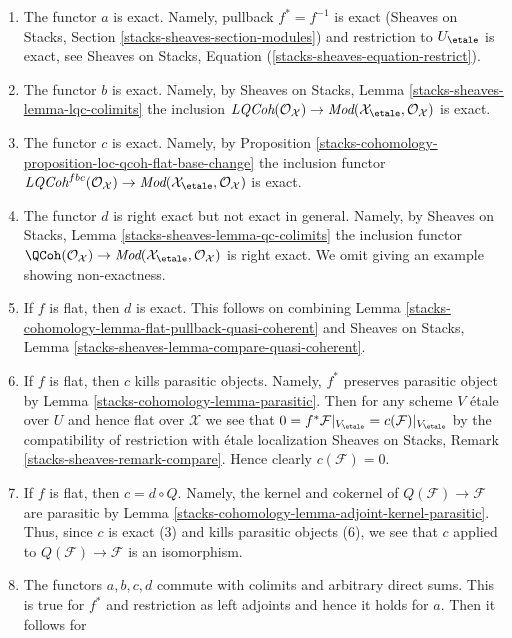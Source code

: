 \begin{enumerate}
\item The functor $a$ is exact. Namely, pullback $f^* = f^{-1}$ is exact
(Sheaves on Stacks, Section \ref{stacks-sheaves-section-modules})
and restriction to $U_\etale$ is exact, see
Sheaves on Stacks, Equation (\ref{stacks-sheaves-equation-restrict}).
\item The functor $b$ is exact. Namely, by
Sheaves on Stacks, Lemma \ref{stacks-sheaves-lemma-lqc-colimits}
the inclusion $\textit{LQCoh}(\mathcal{O}_\mathcal{X}) \to
\textit{Mod}(\mathcal{X}_\etale, \mathcal{O}_\mathcal{X})$ is exact.
\item The functor $c$ is exact. Namely, by
Proposition \ref{stacks-cohomology-proposition-loc-qcoh-flat-base-change}
the inclusion functor $\textit{LQCoh}^{fbc}(\mathcal{O}_\mathcal{X}) \to
\textit{Mod}(\mathcal{X}_\etale, \mathcal{O}_\mathcal{X})$ is exact.
\item The functor $d$ is right exact but not exact in general.
Namely, by Sheaves on Stacks, Lemma
\ref{stacks-sheaves-lemma-qc-colimits}
the inclusion functor $\QCoh(\mathcal{O}_\mathcal{X}) \to
\textit{Mod}(\mathcal{X}_\etale, \mathcal{O}_\mathcal{X})$ is right
exact. We omit giving an example showing non-exactness.
\item If $f$ is flat, then $d$ is exact. This follows on combining
Lemma \ref{stacks-cohomology-lemma-flat-pullback-quasi-coherent} and
Sheaves on Stacks, Lemma \ref{stacks-sheaves-lemma-compare-quasi-coherent}.
\item If $f$ is flat, then $c$ kills parasitic objects.
Namely, $f^*$ preserves parasitic object by Lemma \ref{stacks-cohomology-lemma-parasitic}.
Then for any scheme $V$ \'etale over $U$ and hence flat over $\mathcal{X}$
we see that
$0 = f^*\mathcal{F}|_{V_\etale} = c(\mathcal{F})|_{V_\etale}$
by the compatibility of restriction with \'etale localization
Sheaves on Stacks, Remark \ref{stacks-sheaves-remark-compare}.
Hence clearly $c(\mathcal{F}) = 0$.
\item If $f$ is flat, then $c = d \circ Q$. Namely, the kernel and
cokernel of $Q(\mathcal{F}) \to \mathcal{F}$ are parasitic by
Lemma \ref{stacks-cohomology-lemma-adjoint-kernel-parasitic}. Thus, since
$c$ is exact (3) and kills parasitic objects (6),
we see that $c$ applied to $Q(\mathcal{F}) \to \mathcal{F}$
is an isomorphism.
\item The functors $a, b, c, d$ commute with colimits
and arbitrary direct sums. This is true for $f^*$ and restriction
as left adjoints and hence it holds for $a$. Then it follows for

\end{enumerate}
